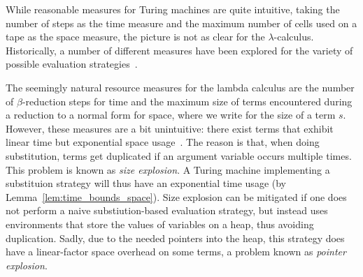 While reasonable measures for Turing machines are quite intuitive, taking the number of steps as the time measure and the maximum number of cells used on a tape as the space measure, the picture is not as clear for the $\lambda$-calculus. Historically, a number of different measures have been explored for the variety of possible evaluation strategies~\cite{Accattoli:cost_models}.

The seemingly natural resource measures for the lambda calculus are the number of $\beta$-reduction steps for time and the maximum size of terms encountered during a reduction to a normal form for space, where we write  for the size of a term $s$. 
However, these measures are a bit unintuitive: there exist terms that exhibit linear time but exponential space usage~\cite{ForsterKunzeRoth:2019:wcbv-Reasonable}. The reason is that, when doing substitution, terms get duplicated if an argument variable occurs multiple times. This problem is known as \emph{size explosion}. A Turing machine implementing a substituion strategy will thus have an exponential time usage (by Lemma~\ref{lem:time_bounds_space}). 
Size explosion can be mitigated if one does not perform a naive substiution-based evaluation strategy, but instead uses environments that store the values of variables on a heap, thus avoiding duplication. Sadly, due to the needed pointers into the heap, this strategy does have a linear-factor space overhead on some terms, a problem known as \emph{pointer explosion}.

